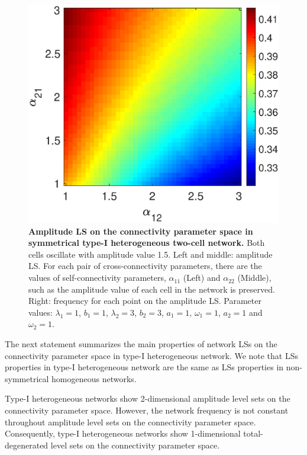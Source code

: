 \begin{figure}[h]
\begin{minipage}{0.32\linewidth}
  \end{minipage} 
   \begin{minipage}{0.32\linewidth}
  \begin{center}
\includegraphics[width=1\linewidth]{Images/photo22_3.eps}
\end{center}

  \end{minipage} 
  
   \caption{\textbf{Amplitude LS on the connectivity parameter space in symmetrical type-\textrm{I} heterogeneous two-cell network.} Both cells oscillate with amplitude value 1.5. Left and middle: amplitude LS. For each pair of cross-connectivity parameters, there are the values of self-connectivity parameters, $\alpha_{11}$ (Left) and $\alpha_{22}$ (Middle), such as the amplitude value of each cell in the network is preserved. Right: frequency for each point on the amplitude LS. Parameter values: $\lambda_{1} = 1$, $b_{1}=1$, $\lambda_{2}=3$, $b_{2}=3$, $a_{1} = 1$, $\omega_{1} = 1$, $a_{2}=1$ and $\omega_{2}=1$.}
  \label{photo22}
\end{figure}

The next statement summarizes the main properties of network LSs on the connectivity parameter space in type-\textrm{I} heterogeneous network. We note that LSs properties in type-\textrm{I} heterogeneous network are the same as LSs properties in non-symmetrical homogeneous networks.

\begin{Statement}
Type-\textrm{I} heterogeneous networks show 2-dimensional amplitude level sets on the connectivity parameter space. However, the network frequency is not constant throughout amplitude level sets on the connectivity parameter space. Consequently, type-\textrm{I} heterogeneous networks show 1-dimensional total-degenerated level sets on the connectivity parameter space.
\end{Statement}

